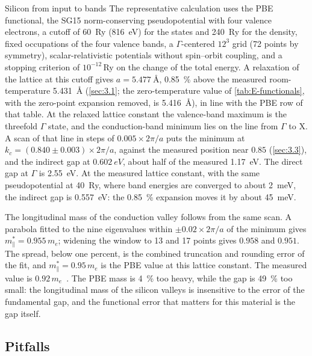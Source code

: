 \begin{workedexample}{Silicon from input to bands}\label{we:E-si-bands}
The representative calculation uses the PBE functional, the SG15 norm-conserving pseudopotential with four valence electrons, a cutoff of \SI{60}{Ry} (\SI{816}{eV}) for the states and \SI{240}{Ry} for the density, fixed occupations of the four valence bands, a $\Gamma$-centered $12^3$ grid (72 points by symmetry), scalar-relativistic potentials without spin--orbit coupling, and a stopping criterion of $10^{-12}$\,Ry on the change of the total energy. A relaxation of the lattice at this cutoff gives $a = \SI{5.477}{\angstrom}$, \SI{0.85}{\percent} above the measured room-temperature \SI{5.431}{\angstrom} (\cref{sec:3.1}; the zero-temperature value of \cref{tab:E-functionals}, with the zero-point expansion removed, is \SI{5.416}{\angstrom}), in line with the PBE row of that table. At the relaxed lattice constant the valence-band maximum is the threefold $\Gamma$ state, and the conduction-band minimum lies on the line from $\Gamma$ to X. A scan of that line in steps of $0.005\times2\pi/a$ puts the minimum at $k_c = (0.840 \pm 0.003)\times2\pi/a$, against the measured position near $0.85$ (\cref{sec:3.3}), and the indirect gap at $\SI{0.602}{eV}$, about half of the measured \SI{1.17}{eV}. The direct gap at $\Gamma$ is \SI{2.55}{eV}. At the measured lattice constant, with the same pseudopotential at \SI{40}{Ry}, where band energies are converged to about \SI{2}{meV}, the indirect gap is \SI{0.557}{eV}: the \SI{0.85}{\percent} expansion moves it by about \SI{45}{meV}.

The longitudinal mass of the conduction valley follows from the same scan. A parabola fitted to the nine eigenvalues within $\pm0.02\times2\pi/a$ of the minimum gives $m^*_\parallel = 0.955\,m_e$; widening the window to 13 and 17 points gives $0.958$ and $0.951$. The spread, below one percent, is the combined truncation and rounding error of the fit, and $m^*_\parallel = 0.95\,m_e$ is the PBE value at this lattice constant. The measured value is $0.92\,m_e$~\cite{hensel1965cyclotron}. The PBE mass is \SI{4}{\percent} too heavy, while the gap is \SI{49}{\percent} too small: the longitudinal mass of the silicon valleys is insensitive to the error of the fundamental gap, and the functional error that matters for this material is the gap itself.
\end{workedexample}

\subsection{Pitfalls}

